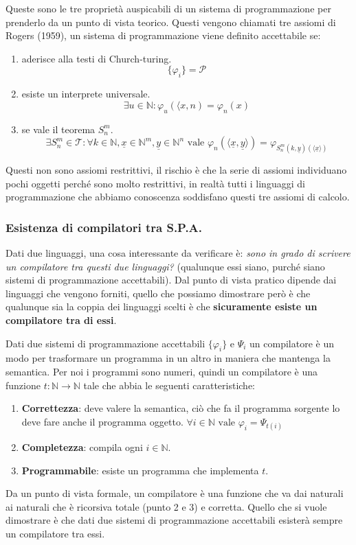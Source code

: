 \documentclass{article}
\begin{document}
Queste sono le tre proprietà auspicabili di un sistema di programmazione per prenderlo da un punto
di vista teorico. Questi vengono chiamati tre assiomi di Rogers (1959), un sistema di programmazione viene
definito accettabile se:
\begin{enumerate}
    \item aderisce alla testi di Church-turing.$$\{\varphi_i\}=\mathcal{P}$$
    \item esiste un interprete universale.$$\exists u\in\mathbb{N}:\varphi_u\left(\langle x,n\right)=\varphi_n(x)$$
    \item se vale il teorema $S_n^m$.$$\exists S_n^m\in\mathcal{T}:\forall k\in\mathbb{N},\underline{x}\in\mathbb{N}^m,\underline{y}\in\mathbb{N}^n\text{ vale }\varphi_n\left(\langle\underline{x},\underline{y}\rangle\right)=\varphi_{S_n^m(k,\underline{y})(\langle\underline{x}\rangle)}$$
\end{enumerate}
Questi non sono assiomi restrittivi, il rischio è che la serie di assiomi individuano pochi oggetti
perché sono molto restrittivi, in realtà tutti i linguaggi di programmazione che abbiamo
conoscenza soddisfano questi tre assiomi di calcolo.

\subsubsection{Esistenza di compilatori tra S.P.A.}
Dati due linguaggi, una cosa interessante da verificare è: \textit{sono in grado di scrivere
    un compilatore tra questi due linguaggi?} (qualunque essi siano, purché siano sistemi di programmazione
accettabili). Dal punto di vista pratico dipende dai linguaggi che vengono forniti, quello che possiamo
dimostrare però è che qualunque sia la coppia dei linguaggi scelti è che \textbf{sicuramente
    esiste un compilatore tra di essi}.

Dati due sistemi di programmazione accettabili $\{\varphi_i\}$ e $\Psi_i$ un compilatore è un modo
per trasformare un programma in un altro in maniera che mantenga la semantica. Per noi i
programmi sono numeri, quindi un compilatore è una funzione $t:\mathbb{N}\rightarrow\mathbb{N}$
tale che abbia le seguenti caratteristiche:
\begin{enumerate}
    \item \textbf{Correttezza}: deve valere la semantica, ciò che fa il programma sorgente
          lo deve fare anche il programma oggetto. $\forall i\in\mathbb{N}\text{ vale }\varphi_i=\Psi_{t(i)}$
    \item \textbf{Completezza}: compila ogni $i\in\mathbb{N}$.
    \item \textbf{Programmabile}: esiste un programma che implementa $t$.
\end{enumerate}
Da un punto di vista formale, un compilatore è una funzione che va dai naturali ai naturali che
è ricorsiva totale (punto 2 e 3) e corretta. Quello che si vuole dimostrare è che dati due sistemi di programmazione accettabili
esisterà sempre un compilatore tra essi.
\end{document}
